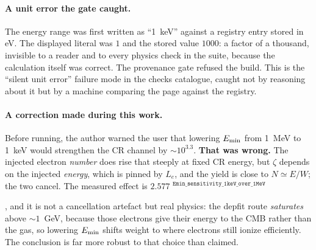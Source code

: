 \documentclass[11pt,a4paper]{article}
\newif\ifprovdraft
\newcommand{\src}[1]{%
  \ifprovdraft
    \ifmmode{}^{\text{\color{gray}\scriptsize\texttt{#1}}}%
    \else{\color{gray}\scriptsize$^{\texttt{#1}}$}%
    \fi
  \fi}
\begin{document}
\paragraph{A unit error the gate caught.} The energy range was first written
as ``\SI{1}{\kilo\electronvolt}'' against a registry entry stored in eV. The
displayed literal was $1$ and the stored value $1000$: a factor of a thousand,
invisible to a reader and to every physics check in the suite, because the
calculation itself was correct. The provenance gate refused the build. This is the
``silent unit error'' failure mode in the checks catalogue, caught not by
reasoning about it but by a machine comparing the page against the registry.

\paragraph{A correction made during this work.} Before running, the author warned
the user that lowering $E_{\rm min}$ from 1~MeV to 1~keV would strengthen the CR
channel by $\sim10^{3.3}$. \textbf{That was wrong.} The injected electron
\emph{number} does rise that steeply at fixed CR energy, but $\zeta$ depends on
the injected \emph{energy}, which is pinned by $L_e$, and the yield is close to
$N\simeq E/W$; the two cancel. The measured effect is
$2.577$\src{Emin\_sensitivity\_1keV\_over\_1MeV}, and it is not a
cancellation artefact but real physics: the depfit route \emph{saturates} above
$\sim1$~GeV, because those electrons give their energy to the CMB rather than the
gas, so lowering $E_{\rm min}$ shifts weight to where electrons still ionize
efficiently. The conclusion is far more robust to that choice than claimed.
\end{document}
